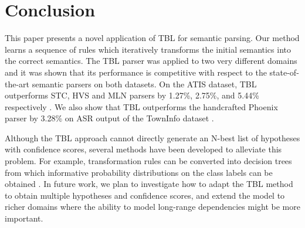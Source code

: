 \documentclass{article}
\begin{document}
\section{Conclusion} \label{sec:conlusion}

This paper presents a novel application of TBL for semantic parsing. Our method learns a sequence of rules which iteratively transforms the initial semantics into the correct semantics.
The TBL parser was applied to two very different domains and it was shown that its performance is competitive with respect to the state-of-the-art semantic parsers on both datasets. 
On the ATIS dataset, TBL outperforms STC, HVS and MLN parsers by 1.27\%, 2.75\%, and 5.44\% respectively \cite{mairesse09,he05,meza08b}. We also show that TBL outperforms the handcrafted Phoenix parser by 3.28\% on ASR output of the TownInfo dataset \cite{mairesse09}.

Although the TBL approach cannot directly generate an N-best list of hypotheses with confidence scores, several methods have been developed to alleviate this problem. For example, transformation rules can be converted into decision trees from which informative probability distributions on the class labels can be obtained \cite{florian00}. In future work, we plan to investigate how to adapt the TBL method to obtain multiple hypotheses and confidence scores, and extend the model to richer domains where the ability to model long-range dependencies might be more important.


\eightpt


\end{document}
